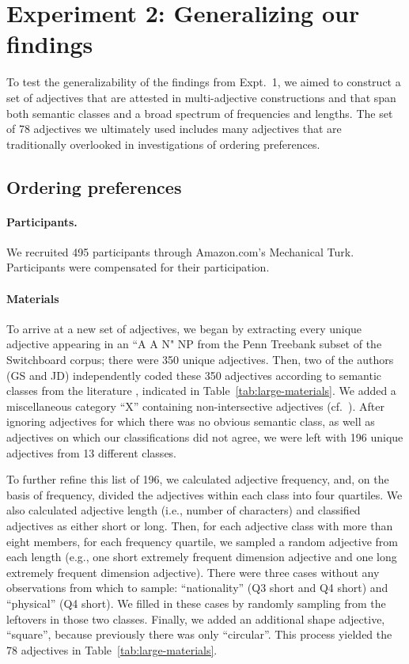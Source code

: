 \documentclass[12pt]{article}
\begin{document}
\section{Experiment 2: Generalizing our findings}

To test the generalizability of the findings from Expt.~1, we aimed to construct a set of adjectives that are attested in multi-adjective constructions and that span both semantic classes and a broad spectrum of frequencies and lengths.  
The set of 78 adjectives we ultimately used includes many adjectives that are traditionally overlooked in investigations of ordering preferences.

\subsection{Ordering preferences}

\paragraph{Participants.} We recruited 495 participants through Amazon.com's Mechanical Turk. Participants were compensated for their participation.

\paragraph{Materials}
To arrive at a new set of adjectives, we began by extracting every unique adjective appearing in an ``A A N" NP from the Penn Treebank subset of the Switchboard corpus; there were 350 unique adjectives. Then, two of the authors (GS and JD) independently coded these 350 adjectives according to semantic classes from the literature \citep[e.g.,][]{dixon1982,Sproat1991}, indicated in Table~\ref{tab:large-materials}. We added a miscellaneous category ``X'' containing non-intersective adjectives (cf.~\citealp{Cinque2014}). After ignoring adjectives for which there was no obvious semantic class, as well as adjectives on which our classifications did not agree, we were left with 196 unique adjectives from 13 different classes.

To further refine this list of 196, we calculated adjective frequency, and, on the basis of frequency, divided the adjectives within each class into four quartiles. We also calculated adjective length (i.e., 
number of characters) and classified adjectives as either short or long. Then, for each adjective class with more than eight members, for each frequency quartile, we sampled a random adjective from each length (e.g., one short extremely frequent dimension adjective and one long extremely frequent dimension adjective). There were three cases without any observations from which to sample: ``nationality'' (Q3 short and Q4 short) and ``physical'' (Q4 short). We filled in these cases by randomly sampling from the leftovers in those two classes. Finally, we added an additional shape adjective, ``square'', because previously there was only ``circular''. This process yielded the 78 adjectives in Table~\ref{tab:large-materials}.%
\end{document}
